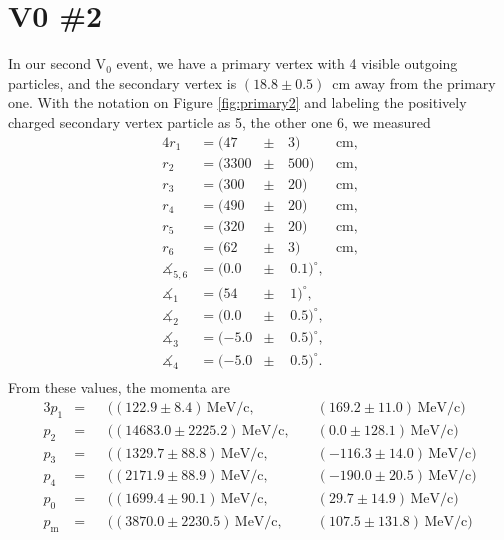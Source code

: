 \documentclass[twocolumn]{article}
\begin{document}
\section{V0 \#2}
In our second V$_0$ event, we have a primary vertex with 4 visible outgoing particles, and the secondary vertex is $(18.8 \pm 0.5)$~cm away from the primary one. With the notation on Figure \ref{fig:primary2} and labeling the positively charged secondary vertex particle as 5, the other one 6, we measured
\begin{alignat*}{4}
r_1 &= (47 &\pm \, &3) \, &\text{cm},\\
r_2 &= (3300 &\pm \, &500) \, &\text{cm},\\
r_3 &= (300 &\pm \, &20) \, &\text{cm},\\
r_4 &= (490 &\pm \, &20) \, &\text{cm},\\
r_5 &= (320 &\pm \, &20) \, &\text{cm},\\
r_6 &= (62&\pm \, &3) \, &\text{cm},\\
\measuredangle_{5,6} &= (0.0 &\pm & \, 0.1)^{\circ},&\\
\measuredangle_{1} &= (54 &\pm & \, 1)^{\circ},&\\
\measuredangle_{2} &= (0.0 &\pm & \, 0.5)^{\circ},&\\
\measuredangle_{3} &= (-5.0 &\pm & \, 0.5)^{\circ},&\\
\measuredangle_{4} &= (-5.0 &\pm & \, 0.5)^{\circ}.&\\
\end{alignat*} 
From these values, the momenta are
\begin{alignat*}{3}
p_1 &= &&((122.9 \pm 8.4)\, \text{MeV/c},\hspace{3pt} && (169.2 \pm 11.0)\, \text{MeV/c})\\
p_2 &= &&((14683.0 \pm 2225.2)\, \text{MeV/c},\hspace{3pt} && (0.0 \pm 128.1)\, \text{MeV/c})\\
p_3 &= &&((1329.7 \pm 88.8)\, \text{MeV/c},\hspace{3pt} && (-116.3 \pm 14.0)\, \text{MeV/c})\\
p_4 &= &&((2171.9 \pm 88.9)\, \text{MeV/c},\hspace{3pt} && (-190.0 \pm 20.5)\, \text{MeV/c})\\
p_{0} &= &&((1699.4 \pm 90.1)\, \text{MeV/c},\hspace{3pt} && (29.7 \pm 14.9)\, \text{MeV/c})\\[6pt]
p_{\text{m}} &= &&((3870.0 \pm 2230.5)\, \text{MeV/c},\hspace{3pt} && (107.5 \pm 131.8)\, \text{MeV/c})
\end{alignat*}
\end{document}
